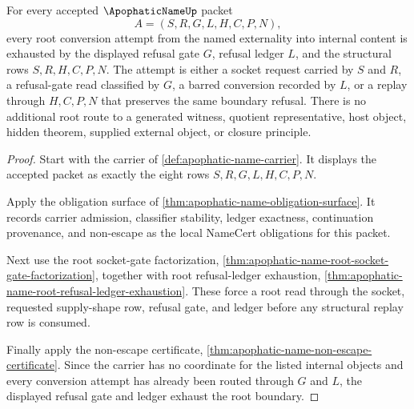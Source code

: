 \begin{theorem}
\label{thm:apophatic-name-root-refusal-boundary-exhaustion}
For every accepted $\ApophaticNameUp$ packet
$$
A=(S,R,G,L,H,C,P,N),
$$
every root conversion attempt from the named externality into internal content is exhausted by the displayed refusal gate $G$, refusal ledger $L$, and the structural rows $S,R,H,C,P,N$. The attempt is either a socket request carried by $S$ and $R$, a refusal-gate read classified by $G$, a barred conversion recorded by $L$, or a replay through $H,C,P,N$ that preserves the same boundary refusal. There is no additional root route to a generated witness, quotient representative, host object, hidden theorem, supplied external object, or closure principle.
\end{theorem}
\begin{proof}
Start with the carrier of \autoref{def:apophatic-name-carrier}. It displays the accepted packet as exactly the eight rows $S,R,G,L,H,C,P,N$.

Apply the obligation surface of \autoref{thm:apophatic-name-obligation-surface}. It records carrier admission, classifier stability, ledger exactness, continuation provenance, and non-escape as the local NameCert obligations for this packet.

Next use the root socket-gate factorization, \autoref{thm:apophatic-name-root-socket-gate-factorization}, together with root refusal-ledger exhaustion, \autoref{thm:apophatic-name-root-refusal-ledger-exhaustion}. These force a root read through the socket, requested supply-shape row, refusal gate, and ledger before any structural replay row is consumed.

Finally apply the non-escape certificate, \autoref{thm:apophatic-name-non-escape-certificate}. Since the carrier has no coordinate for the listed internal objects and every conversion attempt has already been routed through $G$ and $L$, the displayed refusal gate and ledger exhaust the root boundary.
\end{proof}

